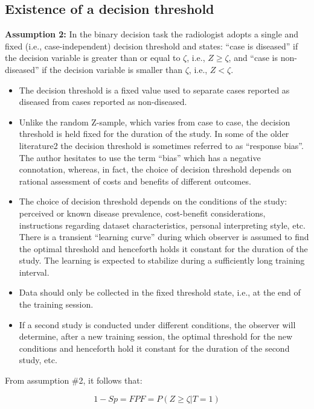 \documentclass[
]{book}
\providecommand{\tightlist}{%
  \setlength{\itemsep}{0pt}\setlength{\parskip}{0pt}}
\begin{document}
\hypertarget{existence-of-a-decision-threshold}{%
\subsection{Existence of a decision threshold}\label{existence-of-a-decision-threshold}}

\textbf{Assumption 2:} In the binary decision task the radiologist adopts a single and fixed (i.e., case-independent) decision threshold and states: ``case is diseased'' if the decision variable is greater than or equal to \(\zeta\), i.e., \(Z \geq \zeta\), and ``case is non-diseased'' if the decision variable is smaller than \(\zeta\), i.e., \(Z <\zeta\).

\begin{itemize}
\tightlist
\item
  The decision threshold is a fixed value used to separate cases reported as diseased from cases reported as non-diseased.
\item
  Unlike the random Z-sample, which varies from case to case, the decision threshold is held fixed for the duration of the study. In some of the older literature2 the decision threshold is sometimes referred to as ``response bias''. The author hesitates to use the term ``bias'' which has a negative connotation, whereas, in fact, the choice of decision threshold depends on rational assessment of costs and benefits of different outcomes.
\item
  The choice of decision threshold depends on the conditions of the study: perceived or known disease prevalence, cost-benefit considerations, instructions regarding dataset characteristics, personal interpreting style, etc. There is a transient ``learning curve'' during which observer is assumed to find the optimal threshold and henceforth holds it constant for the duration of the study. The learning is expected to stabilize during a sufficiently long training interval.
\item
  Data should only be collected in the fixed threshold state, i.e., at the end of the training session.
\item
  If a second study is conducted under different conditions, the observer will determine, after a new training session, the optimal threshold for the new conditions and henceforth hold it constant for the duration of the second study, etc.
\end{itemize}

From assumption \#2, it follows that:

\begin{equation} 
1-Sp=FPF=P(Z\ge \zeta|T=1)
\label{eq:binary-task-modelFPF}
\end{equation}
\end{document}
